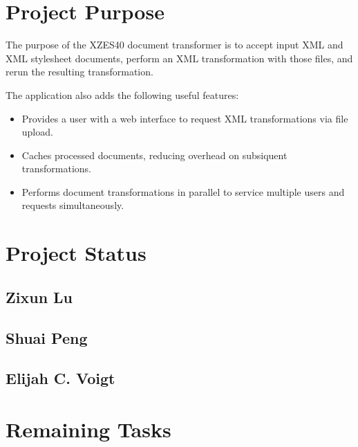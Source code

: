 \section{Project Purpose}

The purpose of the XZES40 document transformer is to accept input XML and XML stylesheet documents, perform an XML transformation with those files, and rerun the resulting transformation.

The application also adds the following useful features:

\begin{itemize}
  \item Provides a user with a web interface to request XML transformations via file upload.
  \item Caches processed documents, reducing overhead on subsiquent transformations.
  \item Performs document transformations in parallel to service multiple users and requests simultaneously.
\end{itemize}


\section{Project Status}

\subsection{Zixun Lu}



\subsection{Shuai Peng}



\subsection{Elijah C. Voigt}




\section{Remaining Tasks}

